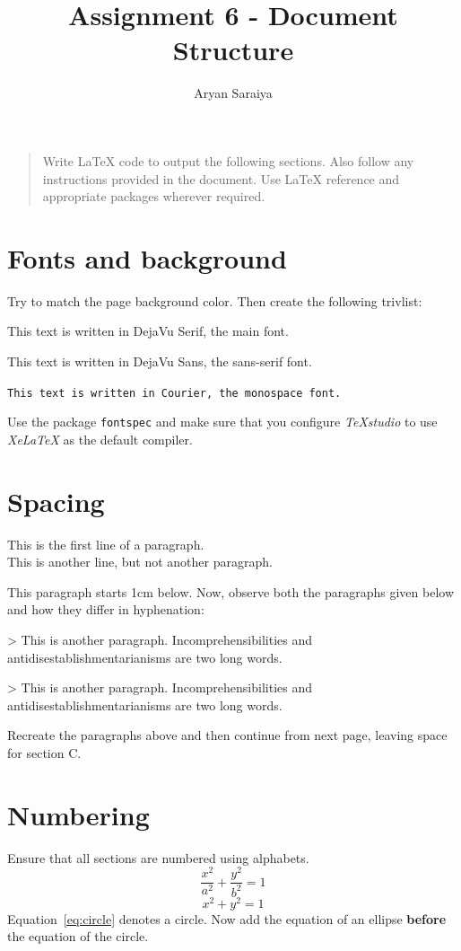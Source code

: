 \documentclass[a4paper,10pt]{article}
\title{Assignment 6 - Document Structure}
\author{Aryan Saraiya}
\date{}
\begin{document}
\maketitle

\begin{quotation}\small
Write \LaTeX{} code to output the following sections. Also follow any
instructions provided in the document. Use \LaTeX{} reference and
appropriate packages wherever required.
\end{quotation}

\section{Fonts and background}
Try to match the page background color. Then create the
following trivlist:
\begin{trivlist}
\item This text is written in DejaVu Serif, the main font.
\item \textsf{This text is written in DejaVu Sans, the sans-serif font.}
\item \texttt{This text is written in Courier, the monospace font.}
\end{trivlist}
Use the package \texttt{fontspec} and make sure that you configure
\emph{TeXstudio} to use \emph{XeLaTeX} as the default compiler.

\section{Spacing}
This is the first line of a paragraph.\\
This is another line, but not another paragraph.

\vspace{1cm}
This paragraph starts 1cm below. Now, observe both the paragraphs given
below and how they differ in hyphenation:

> This is another paragraph. Incomprehensibilities and
antidisestablishmentarianisms are two long words.

{ 
> This is another paragraph. Incomprehensibilities and
antidisestablishmentarianisms are two long words.\par}

Recreate the paragraphs above and then continue from next page, leaving
space for section C.

\newpage
\setcounter{section}{3}%
\section{Numbering}
Ensure that all sections are numbered using alphabets.
\begin{equation}
  \frac{x^2}{a^2} + \frac{y^2}{b^2} = 1
\end{equation}
\begin{equation}
  x^2 + y^2 = 1
  \label{eq:circle}
\end{equation}
Equation~\ref{eq:circle} denotes a circle. Now add the equation of an
ellipse \textbf{before} the equation of the circle.
\end{document}

